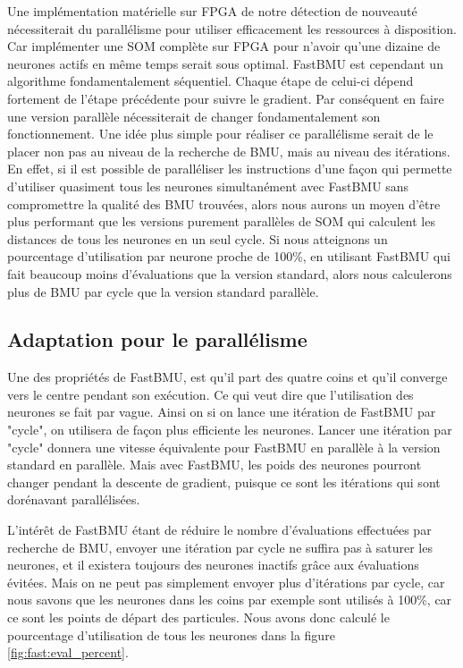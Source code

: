 	Une implémentation matérielle sur FPGA de notre détection de nouveauté nécessiterait du parallélisme pour utiliser efficacement les ressources à disposition. Car implémenter une SOM complète sur FPGA pour n'avoir qu'une dizaine de neurones actifs en même temps serait sous optimal. FastBMU est cependant un algorithme fondamentalement séquentiel. Chaque étape de celui-ci dépend fortement de l'étape précédente pour suivre le gradient. Par conséquent en faire une version parallèle nécessiterait de changer fondamentalement son fonctionnement. Une idée plus simple pour réaliser ce parallélisme serait de le placer non pas au niveau de la recherche de BMU, mais au niveau des itérations. En effet, si il est possible de paralléliser les instructions d'une façon qui permette d'utiliser quasiment tous les neurones simultanément avec FastBMU sans compromettre la qualité des BMU trouvées, alors nous aurons un moyen d'être plus performant que les versions purement parallèles de SOM qui calculent les distances de tous les neurones en un seul cycle. Si nous atteignons un pourcentage d'utilisation par neurone proche de 100\%, en utilisant FastBMU qui fait beaucoup moins d'évaluations que la version standard, alors nous calculerons plus de BMU par cycle que la version standard parallèle.

	\subsection{Adaptation pour le parallélisme}

	Une des propriétés de FastBMU, est qu'il part des quatre coins et qu'il converge vers le centre pendant son exécution. Ce qui veut dire que l'utilisation des neurones se fait par vague. Ainsi on si on lance une itération de FastBMU par "cycle", on utilisera de façon plus efficiente les neurones. Lancer une itération par "cycle" donnera une vitesse équivalente pour FastBMU en parallèle à la version standard en parallèle. Mais avec FastBMU, les poids des neurones pourront changer pendant la descente de gradient, puisque ce sont les itérations qui sont dorénavant parallélisées.

	L'intérêt de FastBMU étant de réduire le nombre d'évaluations effectuées par recherche de BMU, envoyer une itération par cycle ne suffira pas à saturer les neurones, et il existera toujours des neurones inactifs grâce aux évaluations évitées. Mais on ne peut pas simplement envoyer plus d'itérations par cycle, car nous savons que les neurones dans les coins par exemple sont utilisés à 100\%, car ce sont les points de départ des particules. Nous avons donc calculé le pourcentage d'utilisation de tous les neurones dans la figure \ref{fig:fast:eval_percent}. 

